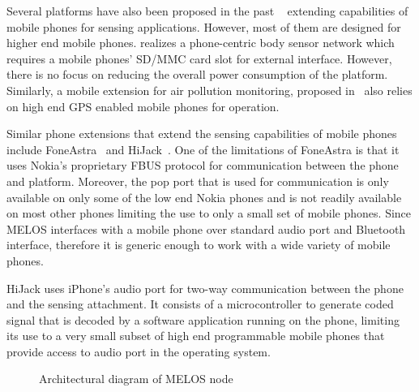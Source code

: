 \documentclass[10pt]{sigplan-proc-varsize}
\newcommand{\redcolor}[1]{\textcolor{red}{#1}}
\newcommand{\melos}{MELOS }
\begin{document}
Several platforms have also been proposed in the past ~\cite{psi,nsmarts,smartconnect,foneastra,hijack} extending capabilities of mobile phones for sensing applications. However, most of them are designed for higher end mobile phones. \cite{psi} realizes a phone-centric body sensor network which requires a mobile phones'  SD/MMC card slot for external interface. However, there is no focus on reducing the overall power consumption of the platform. Similarly, a mobile extension for air pollution monitoring, proposed in~\cite{nsmarts} also relies on high end GPS enabled mobile phones for operation. 

Similar phone extensions that extend the sensing capabilities of mobile phones include FoneAstra~\cite{foneastra} and HiJack~\cite{hijack}. One of the limitations of FoneAstra is that it uses Nokia's proprietary FBUS protocol for communication between the phone and platform. Moreover, the pop port that is used for communication is only available on only some of the low end Nokia phones and is not readily available on most other phones limiting the use to only a small set of mobile phones. Since \melos interfaces with a mobile phone over standard audio port and Bluetooth interface, therefore it is generic enough to work with a wide variety of mobile phones. 

HiJack uses iPhone's audio port for two-way communication between the phone and the sensing attachment. It consists of a microcontroller to generate coded signal that is decoded by a software application running on the phone, limiting its use to a very small subset of high end programmable mobile phones that provide access to audio port in the operating system. 

\begin{figure}
\centering
{}
\caption{Architectural diagram of \melos node}
\label{fig:blockdiagram}
\vspace{-5mm}
\end{figure}

\end{document}
